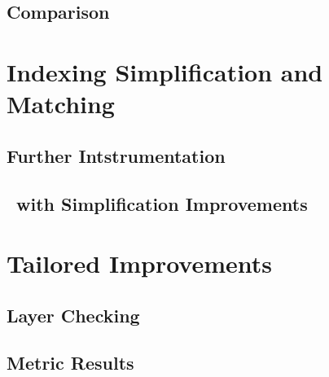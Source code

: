 \subsection{Comparison}

\section{Indexing Simplification and Matching}
\subsection{Further Intstrumentation}

\subsection{\Beagle\ with Simplification Improvements}

\section{Tailored Improvements}
\label{sec:tailresults}

\subsection{Layer Checking}

\subsection{Metric Results}



